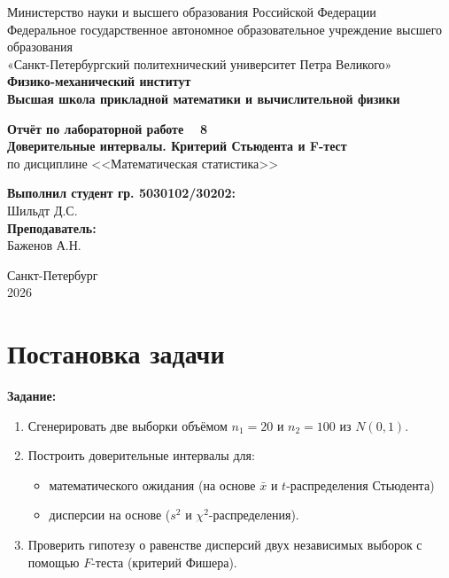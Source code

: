 \documentclass[a4paper, 14pt]{extarticle}
\begin{document}
\begin{titlepage}
    \begin{center}
        Министерство науки и высшего образования Российской Федерации\\
        Федеральное государственное автономное образовательное учреждение высшего образования\\
        «Санкт-Петербургский политехнический университет Петра Великого»\\
        
        \textbf{Физико-механический институт}\\
        \textbf{Высшая школа прикладной математики и вычислительной физики}
    \end{center}

    \vfill
    
    \begin{center}
        \textbf{Отчёт по лабораторной работе \textnumero~ 8\\[0.5cm]}
        \textbf{Доверительные интервалы. Критерий Стьюдента и F-тест\\}
        по дисциплине <<Математическая статистика>>
    \end{center}

    \vfill

    \hfill
    \begin{minipage}{0.45\textwidth}
        \textbf{Выполнил студент гр. 5030102/30202:}\\
        Шильдт Д.С.\\[0.5cm]
        \textbf{Преподаватель:}\\ 
        Баженов А.Н.
    \end{minipage}

    \vfill

    \begin{center}
        Санкт-Петербург\\2026
    \end{center}
\end{titlepage}

\setcounter{page}{2}

\tableofcontents
\newpage

\section{Постановка задачи}

\textbf{Задание:}
\begin{enumerate}
    \item Сгенерировать две выборки объёмом $n_1 = 20$ и $n_2 = 100$ из $N(0,1)$.
    \item Построить доверительные интервалы для:
    \begin{itemize}
        \item математического ожидания (на основе $\bar{x}$ и $t$-распределения Стьюдента)
        \item дисперсии на основе ($s^2$ и $\chi^2$-распределения).
    \end{itemize}
    \item Проверить гипотезу о равенстве дисперсий двух независимых выборок с помощью $F$-теста (критерий Фишера).
\end{enumerate}
\end{document}
